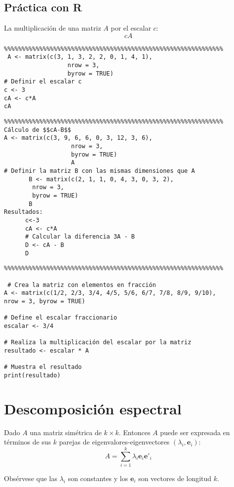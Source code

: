 \begin{}
\subsection{Práctica con R}
La multiplicación de una matriz $A$ por el escalar $c$: $$cA$$

\begin{verbatim}
%%%%%%%%%%%%%%%%%%%%%%%%%%%%%%%%%%%%%%%%%%%%%%%%%%%%%%%%%%%%%%
 A <- matrix(c(3, 1, 3, 2, 2, 0, 1, 4, 1),
                  nrow = 3,
                  byrow = TRUE)
# Definir el escalar c
c <- 3
cA <- c*A
cA
\end{verbatim}


\begin{verbatim}
%%%%%%%%%%%%%%%%%%%%%%%%%%%%%%%%%%%%%%%%%%%%%%%%%%%%%%%%%%%%%%
Cálculo de $$cA-B$$
A <- matrix(c(3, 9, 6, 6, 0, 3, 12, 3, 6),
                   nrow = 3, 
                   byrow = TRUE)
                   A
# Definir la matriz B con las mismas dimensiones que A
       B <- matrix(c(2, 1, 1, 0, 4, 3, 0, 3, 2),
        nrow = 3,
        byrow = TRUE)
       B
Resultados:
      c<-3
      cA <- c*A
      # Calcular la diferencia 3A - B
      D <- cA - B
      D    
\end{verbatim}
\begin{verbatim}
%%%%%%%%%%%%%%%%%%%%%%%%%%%%%%%%%%%%%%%%%%%%%%%%%%%%%%%%%%%%%%

 # Crea la matriz con elementos en fracción
A <- matrix(c(1/2, 2/3, 3/4, 4/5, 5/6, 6/7, 7/8, 8/9, 9/10), 
nrow = 3, byrow = TRUE)

# Define el escalar fraccionario
escalar <- 3/4

# Realiza la multiplicación del escalar por la matriz
resultado <- escalar * A

# Muestra el resultado
print(resultado)   
\end{verbatim}
\section{Descomposición espectral}

\begin{definition}
Dado $A$ una matriz simétrica de $k\times k$. Entonces $A$ puede ser expresada en términos de sus $k$ parejas de eigenvalores-eigenvectores $(\lambda_{i},\textbf{e}_{i})$: 
$$
A=\sum_{i=1}^{k}\lambda_{i}\textbf{e}_{i}\textbf{e}'_{i}
$$
\end{definition}

Obsérvese que las $\lambda_i$ son constantes y los $\textbf{e}_{i}$ son vectores de longitud $k$.


\end{}
